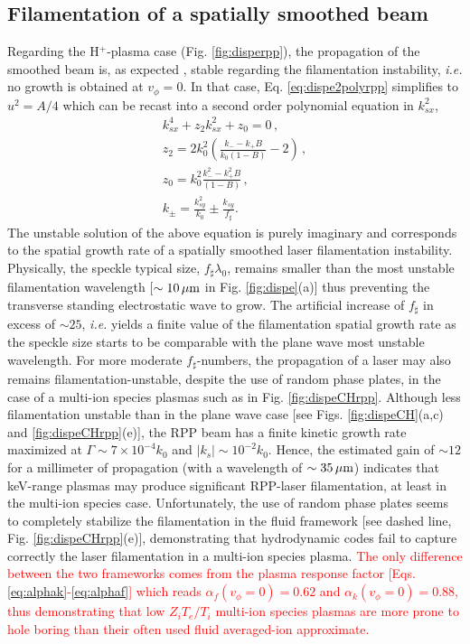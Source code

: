 \documentclass[
 reprint,
 superscriptaddress,
 amsmath,amssymb,
 aps,
]{revtex4-1}
\def\tc{\textcolor{red}}
\begin{document}
\subsection{Filamentation of a spatially smoothed beam}\label{sec:filam}
Regarding the H$^+$-plasma case (Fig. \ref{fig:disperpp}), the propagation of the smoothed beam is, as expected  \cite[]{NatPhys_Glenzer,POP_Berger_98b,PRL_Sarri_2011}, stable regarding the filamentation instability, \emph{i.e.} no growth is obtained  at $v_\phi=0$. In that case, Eq. \eqref{eq:dispe2polyrpp} simplifies to $u^2=A/4$ which can be recast into a second order polynomial equation in $k_{sx}^2$,
\begin{align}
    k_{sx}^4 + z_2 k_{sx}^2 +z_0=0 \, ,\nonumber \\
    z_2 = 2k_0^2\left(  \frac{k_- -k_+ B}{k_0(1-B)} -2  \right)\, , \nonumber\\
    z_0 = k_0^2\frac{k_-^2 -k_+^2 B}{(1-B)}\, ,\nonumber \\
    k_\pm =\frac{k_{sy}^2}{k_0}\pm\frac{k_{sy}}{f_\sharp} .\label{eq:dispefilam}
\end{align}
The unstable solution of the above equation is purely imaginary and corresponds to the spatial growth rate of a spatially smoothed laser filamentation instability.
Physically, the speckle typical size, $f_\sharp\lambda_0$, remains smaller than the most unstable filamentation wavelength [$\sim 10 \,\rm\mu m$ in Fig. \ref{fig:dispe}(a)] thus preventing the transverse standing electrostatic wave to grow. The artificial increase of $f_\sharp$ in excess of $\sim 25$, \emph{i.e.} yields a finite value of the filamentation spatial growth rate as the speckle size starts to be comparable with the plane wave most unstable wavelength. 
For more moderate  $f_\sharp$-numbers, the propagation of a laser may  also remains filamentation-unstable, despite the use of random phase plates,  in  the case of a multi-ion species plasmas such as in Fig.   \ref{fig:dispeCHrpp}. 
Although less filamentation unstable than in the plane wave case [see Figs. \ref{fig:dispeCH}(a,c) and \ref{fig:dispeCHrpp}(e)], the RPP beam has a finite kinetic growth rate maximized at  $\Gamma\sim 7\times 10^{-4}k_0 $  and $\vert k_s\vert \sim  10^{-2}k_0$. 
Hence, the estimated  gain of $\sim 12$   for a millimeter of propagation (with a wavelength of $\sim 35 \,\rm \mu m$) indicates that keV-range plasmas may produce significant RPP-laser filamentation, at least in the multi-ion species case.
Unfortunately, the use of random phase plates seems to completely stabilize the filamentation in the fluid framework [see dashed line, Fig. \ref{fig:dispeCHrpp}(e)], demonstrating that  hydrodynamic codes fail to capture correctly the laser filamentation in a multi-ion species plasma. \tc{The only difference between the two frameworks comes from the plasma response factor [Eqs. \eqref{eq:alphak}-\eqref{eq:alphaf}] which reads $\alpha_{f}(v_\phi=0)=0.62$ and $\alpha_{k}(v_\phi=0)=0.88$, thus demonstrating that low $Z_iT_e/T_i$ multi-ion species plasmas are more prone to hole boring than their often used fluid averaged-ion  approximate. } 
\end{document}
